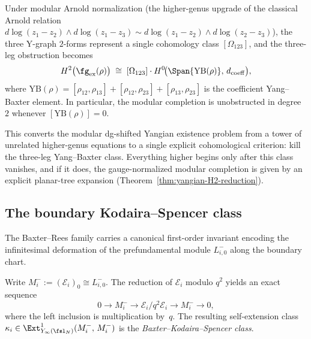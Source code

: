 Under modular Arnold normalization (the higher-genus upgrade of the
classical Arnold relation $d\log(z_1 - z_2) \wedge d\log(z_1 - z_3)
\sim d\log(z_1 - z_2) \wedge d\log(z_2 - z_3)$), the three Y-graph
$2$-forms represent a single cohomology class $[\Omega_{123}]$, and
the three-leg obstruction becomes
\begin{equation}\label{eq:modular-YB-identification}
 H^2\bigl(\fg_{\mathrm{ex}}(\rho)\bigr)
 \;\cong\;
 [\Omega_{123}] \cdot
 H^0\!\bigl(\Span\{\mathrm{YB}(\rho)\},\,d_{\mathrm{coeff}}\bigr),
\end{equation}
where
$\mathrm{YB}(\rho) = [\rho_{12},\rho_{13}] + [\rho_{12},\rho_{23}]
+ [\rho_{13},\rho_{23}]$ is the coefficient Yang--Baxter element.
In particular, the modular completion is unobstructed in degree~$2$
whenever $[\mathrm{YB}(\rho)] = 0$.

\begin{remark}
\label{rem:yangian-frontier-shift}
This converts the modular dg-shifted Yangian existence problem from a
tower of unrelated higher-genus equations to a single explicit
cohomological criterion: kill the three-leg Yang--Baxter class.
Everything higher begins only after this class vanishes, and if it
does, the gauge-normalized modular completion is given by an explicit
planar-tree expansion
(Theorem~\ref{thm:yangian-H2-reduction}).
\end{remark}

\subsection{The boundary Kodaira--Spencer class}

The Baxter--Rees family carries a canonical first-order invariant
encoding the infinitesimal deformation of the prefundamental module
$L^-_{i,0}$ along the boundary chart.

\begin{definition}
\label{def:yangian-baxter-KS-class}
Write $M_i^- := (\mathcal{E}_i)_0 \cong L^-_{i,0}$. The reduction
of $\mathcal{E}_i$ modulo $q^2$ yields an exact sequence
\begin{equation}\label{eq:baxter-KS-sequence}
 0 \longrightarrow M_i^- \longrightarrow
 \mathcal{E}_i/q^2\mathcal{E}_i \longrightarrow
 M_i^- \longrightarrow 0,
\end{equation}
where the left inclusion is multiplication by~$q$. The resulting
self-extension class
$\kappa_i \in \Ext^1_{Y_\infty(\fsl_N)}(M_i^-,\,M_i^-)$
is the \emph{Baxter--Kodaira--Spencer class}.
\end{definition}

